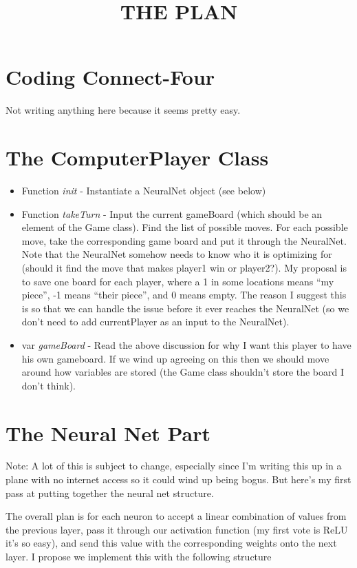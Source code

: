 \documentclass{article}[12pt]
\title{THE PLAN}
\date{}
\begin{document}
\maketitle

\section{Coding Connect-Four}
Not writing anything here because it seems pretty easy.

\section{The ComputerPlayer Class}

\begin{itemize}
\item Function \emph{init} - Instantiate a NeuralNet object (see below)
\item Function \emph{takeTurn} - Input the current gameBoard (which should be an element of the Game class). Find the list of possible moves. For each possible move, take the corresponding game board and put it through the NeuralNet. Note that the NeuralNet somehow needs to know who it is optimizing for (should it find the move that makes player1 win or player2?). My proposal is to save one board for each player, where a 1 in some locations means ``my piece'', -1 means ``their piece'', and 0 means empty. The reason I suggest this is so that we can handle the issue before it ever reaches the NeuralNet (so we don't need to add currentPlayer as an input to the NeuralNet).
\item var \emph{gameBoard} - Read the above discussion for why I want this player to have his own gameboard. If we wind up agreeing on this then we should move around how variables are stored (the Game class shouldn't store the board I don't think).
\end{itemize}

\section{The Neural Net Part}
Note: A lot of this is subject to change, especially since I'm writing this up in a plane with no internet access so it could wind up being bogus. But here's my first pass at putting together the neural net structure.

The overall plan is for each neuron to accept a linear combination of values from the previous layer, pass it through our activation function (my first vote is ReLU it's so easy), and send this value with the corresponding weights onto the next layer. I propose we implement this with the following structure
\end{document}
